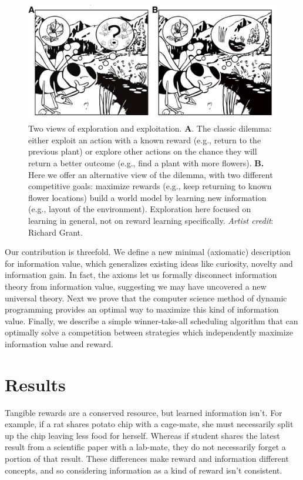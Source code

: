 \documentclass[9pt,twocolumn,twoside]{pnas-new}
\begin{document}
\begin{figure}
	[tbhp] \centering 
	\includegraphics[width=.95\linewidth]{figures/fig1.png} 
	\caption{Two views of exploration and exploitation. \textbf{A}. The classic dilemma: either exploit an action with a known reward (e.g., return to the previous plant) or explore other actions on the chance they will return a better outcome (e.g., find a plant with more flowers). \textbf{B.} Here we offer an alternative view of the dilemma, with two different competitive goals: maximize rewards (e.g., keep returning to known flower locations)  build a world model by learning new information (e.g., layout of the environment). Exploration here focused on learning in general, not on reward learning specifically. \textit{Artist credit}: Richard Grant.}
	\label{fig:f1} 
\end{figure}

Our contribution is threefold. We define a new minimal (axiomatic) description for information value, which generalizes existing ideas like curiosity, novelty and information gain. In fact, the axioms let us formally disconnect information theory \cite{Shannon1948} from information value, suggesting we may have uncovered a new universal theory. Next we prove that the computer science method of dynamic programming \cite{Bellmann1954,Sutton2018} provides an optimal way to maximize this kind of information value. Finally, we describe a simple winner-take-all scheduling algorithm that can optimally solve a competition between strategies which independently maximize information value and reward. 

\section*{Results}
Tangible rewards are a conserved resource, but learned information isn't. For example, if a rat shares potato chip with a cage-mate, she must necessarily split up the chip leaving less food for herself. Whereas if student shares the latest result from a scientific paper with a lab-mate, they do not necessarily forget a portion of that result. These differences  make reward and information different concepts, and so considering information as a kind of reward isn't consistent.  
\end{document}
